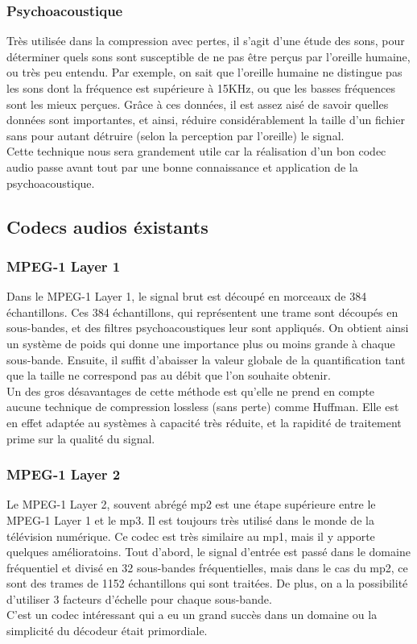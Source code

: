\documentclass[a4paper,12pt]{article}
\begin{document}
		\subsubsection{Psychoacoustique}
Très utilisée dans la compression avec pertes, il s'agit d'une étude des
sons,  pour déterminer quels sons sont susceptible de ne pas être perçus
par l'oreille humaine,  ou très  peu entendu.  Par exemple,  on sait que
l'oreille  humaine ne  distingue pas  les  sons  dont  la  fréquence est
supérieure à 15KHz, ou que les basses fréquences sont les mieux perçues.
Grâce à ces  données,  il est assez aisé de  savoir quelles données sont
importantes,  et ainsi,  réduire considérablement la taille d'un fichier
sans  pour  autant  détruire  (selon  la  perception  par  l'oreille) le
signal.\\
Cette technique nous  sera grandement utile car la  réalisation d'un bon
codec audio passe  avant tout par une bonne  connaissance et application
de la psychoacoustique.

\newpage

	\subsection{Codecs audios éxistants}

		\subsubsection{MPEG-1 Layer 1}
Dans le MPEG-1  Layer 1,  le signal brut est découpé  en morceaux de 384
échantillons.  Ces  384 échantillons,  qui  représentent une  trame sont
découpés en  sous-bandes,  et  des  filtres  psychoacoustiques leur sont
appliqués.   On  obtient  ainsi  un  système  de  poids  qui  donne  une
importance plus ou moins grande à chaque sous-bande.  Ensuite, il suffit
d'abaisser la valeur globale de la  quantification tant que la taille ne
correspond pas au débit que l'on souhaite obtenir.\\
Un des gros désavantages de cette méthode est qu'elle ne prend en compte
aucune  technique de  compression lossless  (sans perte)  comme Huffman.
Elle est  en effet adaptée au  systèmes à capacité  très réduite,  et la
rapidité de traitement prime sur la qualité du signal.

		\subsubsection{MPEG-1 Layer 2}
Le MPEG-1 Layer 2,  souvent abrégé mp2 est une étape supérieure entre le
MPEG-1 Layer 1 et le mp3.  Il est toujours très utilisé dans le monde de
la télévision numérique.  Ce codec est très similaire au mp1,  mais il y
apporte quelques  amélioratoins.  Tout d'abord,  le signal  d'entrée est
passé  dans  le   domaine  fréquentiel  et  divisé   en  32  sous-bandes
fréquentielles,  mais dans  le cas du  mp2,  ce sont des  trames de 1152
échantillons qui sont traitées.  De plus, on a la possibilité d'utiliser
3 facteurs d'échelle pour chaque sous-bande.\\
C'est un codec intéressant  qui a eu un grand succès  dans un domaine ou
la simplicité du décodeur était primordiale.
\end{document}
